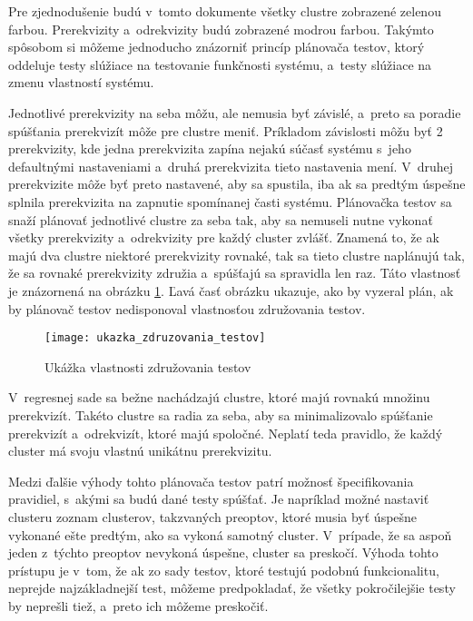 Pre zjednodušenie budú v~tomto dokumente všetky clustre zobrazené zelenou farbou.
Prerekvizity a~odrekvizity budú zobrazené modrou farbou. Takýmto spôsobom
si môžeme jednoducho znázorniť princíp plánovača testov, ktorý oddeluje testy
slúžiace na testovanie funkčnosti systému, a~testy slúžiace na zmenu vlastností systému.

Jednotlivé prerekvizity na seba môžu, ale nemusia byť závislé, a~preto 
sa poradie spúšťania prerekvizít môže pre clustre meniť.
Príkladom závislosti môžu byť 2 prerekvizity, kde jedna prerekvizita 
zapína nejakú súčasť systému s~jeho defaultnými nastaveniami 
a~druhá prerekvizita tieto nastavenia mení. 
V~druhej prerekvizite môže byť preto nastavené, aby sa spustila, iba ak 
sa predtým úspešne splnila prerekvizita na zapnutie spomínanej časti 
systému. Plánovačka testov sa snaží plánovať jednotlivé clustre za seba 
tak, aby sa nemuseli nutne vykonať všetky prerekvizity a~odrekvizity pre 
každý cluster zvlášť. Znamená to, že ak majú dva clustre niektoré 
prerekvizity rovnaké, tak sa tieto clustre naplánujú tak, že sa rovnaké 
prerekvizity združia a~spúšťajú sa spravidla len raz. 
Táto vlastnosť je znázornená na obrázku \ref{obrazok:ukazka_zdruzovania_testov}. 
Ľavá časť obrázku ukazuje, ako by vyzeral plán, ak by plánovač testov
nedisponoval vlastnosťou združovania testov.

\begin{figure}[h]
    \begin{center}
    \texttt{[image: ukazka\_zdruzovania\_testov]}
    \caption{Ukážka vlastnosti združovania testov}
    \label{obrazok:ukazka_zdruzovania_testov}
    \end{center}
\end{figure}

V~regresnej sade sa bežne nachádzajú clustre, ktoré majú rovnakú množinu 
prerekvizít. Takéto clustre sa radia za seba, aby sa minimalizovalo
spúšťanie prerekvizít a~odrekvizít, ktoré majú spoločné. Neplatí teda 
pravidlo, že každý cluster má svoju vlastnú unikátnu prerekvizitu.



Medzi ďalšie výhody tohto plánovača testov patrí možnosť špecifikovania 
pravidiel, s~akými sa budú dané testy spúšťať. Je napríklad možné 
nastaviť clusteru zoznam clusterov, takzvaných preoptov, ktoré musia byť 
úspešne vykonané ešte predtým, ako sa vykoná samotný cluster. V~prípade, 
že sa aspoň jeden z~týchto preoptov nevykoná úspešne, cluster sa preskočí.
Výhoda tohto prístupu je v~tom, že ak zo sady testov, ktoré testujú 
podobnú funkcionalitu, neprejde najzákladnejší test, môžeme predpokladať, 
že všetky pokročilejšie testy by neprešli tiež, a~preto ich môžeme preskočiť.

